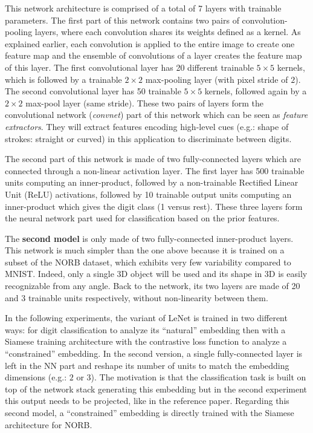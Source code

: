 \documentclass[a4paper,12pt]{report}
\newcommand{\eg}{e.g.}
\begin{document}
This network architecture is comprised of a total of 7 layers with trainable parameters.
The first part of this network contains two pairs of convolution-pooling layers, where each convolution shares its weights defined as a kernel.
As explained earlier, each convolution is applied to the entire image to create one feature map and the ensemble of convolutions of a layer creates the feature map of this layer.
The first convolutional layer has 20 different trainable $5 \times 5$ kernels, which is followed by a trainable $2 \times 2$ max-pooling layer (with pixel stride of $2$).
The second convolutional layer has 50 trainable $5 \times 5$ kernels, followed again by a $2 \times 2$ max-pool layer (same stride).
These two pairs of layers form the convolutional network ({\em convnet}) part of this network which can be seen as {\em feature extractors}.
They will extract features encoding high-level cues (\eg: shape of strokes: straight or curved) in this application to discriminate between digits.

The second part of this network is made of two fully-connected layers which are connected through a non-linear activation layer.
The first layer has 500 trainable units computing an inner-product, followed by a non-trainable Rectified Linear Unit (ReLU) activations\cite{nair2010rectified}, followed by 10 trainable output units computing an inner-product which gives the digit class (1 versus rest).
These three layers form the neural network part used for classification based on the prior features.

The {\bf second model} is only made of two fully-connected inner-product layers.
This network is much simpler than the one above because it is trained on a subset of the NORB dataset, which exhibits very few variability compared to MNIST.
Indeed, only a single 3D object will be used and its shape in 3D is easily recognizable from any angle.
Back to the network, its two layers are made of 20 and 3 trainable units respectively, without non-linearity between them. %

In the following experiments, the variant of LeNet is trained in two different ways: for digit classification to analyze its ``natural'' embedding then with a Siamese training architecture with the contrastive loss function to analyze a ``constrained'' embedding.
In the second version, a single fully-connected layer is left in the NN part and reshape its number of units to match the embedding dimensions (\eg: $2$ or $3$).
The motivation is that the classification task is built on top of the network stack generating this embedding but in the second experiment this output needs to be projected, like in the reference paper.
Regarding this second model, a ``constrained'' embedding is directly trained with the Siamese architecture for NORB.
\end{document}
